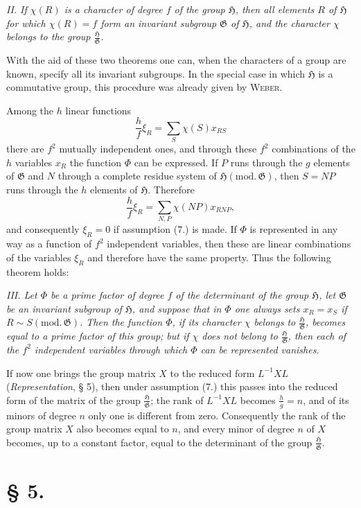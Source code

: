 \documentclass[11pt]{article}
\newcommand{\Hgr}{\mathfrak{H}}
\newcommand{\Ggr}{\mathfrak{G}}
\begin{document}
\emph{II. If $\chi(R)$ is a character of degree $f$ of the group $\Hgr$, then all elements $R$ of $\Hgr$ for which $\chi(R)=f$ form an invariant subgroup $\Ggr$ of $\Hgr$, and the character $\chi$ belongs to the group $\frac{\Hgr}{\Ggr}$.}

With the aid of these two theorems one can, when the characters of a group are known, specify all its invariant subgroups. In the special case in which $\Hgr$ is a commutative group, this procedure was already given by \textsc{Weber}.

Among the $h$ linear functions
\[
  \frac{h}{f}\xi_R=\sum_S\chi(S)x_{RS}
\]
there are $f^2$ mutually independent ones, and through these $f^2$ combinations of the $h$ variables $x_R$ the function $\Phi$ can be expressed. If $P$ runs through the $g$ elements of $\Ggr$ and $N$ through a complete residue system of $\Hgr(\mathrm{mod.}\,\Ggr)$, then $S=NP$ runs through the $h$ elements of $\Hgr$. Therefore
\[
  \frac{h}{f}\xi_R=\sum_{N,P}\chi(NP)x_{RNP},
\]
and consequently $\xi_R=0$ if assumption (7.) is made. If $\Phi$ is represented in any way as a function of $f^2$ independent variables, then these are linear combinations of the variables $\xi_R$ and therefore have the same property. Thus the following theorem holds:

\emph{III. Let $\Phi$ be a prime factor of degree $f$ of the determinant of the group $\Hgr$, let $\Ggr$ be an invariant subgroup of $\Hgr$, and suppose that in $\Phi$ one always sets $x_R=x_S$ if $R\sim S(\mathrm{mod.}\,\Ggr)$. Then the function $\Phi$, if its character $\chi$ belongs to $\frac{\Hgr}{\Ggr}$, becomes equal to a prime factor of this group; but if $\chi$ does not belong to $\frac{\Hgr}{\Ggr}$, then each of the $f^2$ independent variables through which $\Phi$ can be represented vanishes.}

If now one brings the group matrix $X$ to the reduced form $L^{-1}XL$ (\emph{Representation}, § 5), then under assumption (7.) this passes into the reduced form of the matrix of the group $\frac{\Hgr}{\Ggr}$; the rank of $L^{-1}XL$ becomes $\frac{h}{g}=n$, and of its minors of degree $n$ only one is different from zero. Consequently the rank of the group matrix $X$ also becomes equal to $n$, and every minor of degree $n$ of $X$ becomes, up to a constant factor, equal to the determinant of the group $\frac{\Hgr}{\Ggr}$.

\section*{§ 5.}
\end{document}
